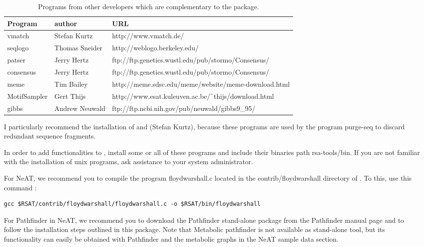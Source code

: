 \documentclass{book}
\begin{document}
\begin{table}
\begin{center}
\begin{tabular}{lll}
\hline
Program & author  & URL \\
\hline
vmatch & Stefan Kurtz & http://www.vmatch.de/ \\
seqlogo & Thomas Sneider & http://weblogo.berkeley.edu/ \\
patser & Jerry Hertz & ftp://ftp.genetics.wustl.edu/pub/stormo/Consensus/ \\
consensus & Jerry Hertz &  ftp://ftp.genetics.wustl.edu/pub/stormo/Consensus/ \\
meme & Tim Bailey & http://meme.sdsc.edu/meme/website/meme-download.html \\
MotifSampler & Gert Thijs & http://www.esat.kuleuven.ac.be/$\tilde{\hspace{0.4em}}$thijs/download.html \\
gibbs & Andrew Neuwald & ftp://ftp.ncbi.nih.gov/pub/neuwald/gibbs9\_95/ \\
\hline
\end{tabular}
\end{center}
\caption{\label{table:other_programs} Programs from other developers
  which are complementary to the \RSAT package.}
\end{table}

I particularly recommend the installation of  and
 (Stefan Kurtz), because these programs are used by
the program purge-seq to discard redundant sequence fragments.

In order to add functionalities to \RSAT, install some or all of these
programs and include their binaries path rsa-tools/bin. If you are not
familiar with the installation of unix programs, ask assistance to
your system administrator.

For NeAT, we recommend you to compile the program floydwarshall.c located in the contrib/floydwarshall directory of \RSAT. To this, use this command :

\begin{verbatim}
gcc $RSAT/contrib/floydwarshall/floydwarshall.c -o $RSAT/bin/floydwarshall
\end{verbatim}

For Pathfinder in NeAT, we recommend you to download the
Pathfinder stand-alone package from the Pathfinder manual page
and to follow the installation steps outlined in this package.
Note that Metabolic pathfinder is not available as stand-alone tool,
but its functionality can easily be obtained with Pathfinder and the
metabolic graphs in the NeAT sample data section.




\end{document}
